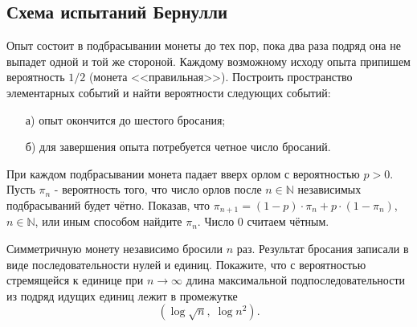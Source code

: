 
\subsection{Схема испытаний Бернулли}

\begin{problem}
Опыт состоит в подбрасывании монеты до тех пор, пока два раза подряд она не выпадет одной и той же стороной. Каждому 
возможному исходу опыта припишем вероятность $1/2$ (монета <<правильная>>). 
Построить пространство элементарных событий и найти вероятности следующих событий: 
\begin{enumerate}
\item[а)] опыт окончится до шестого бросания; 
\item[б)] для завершения опыта потребуется четное число бросаний. 
\end{enumerate}
\end{problem}


\begin{problem}
При каждом подбрасывании монета падает вверх орлом с вероятностью $p>0$. Пусть $\pi _{n} $ - вероятность того, что число орлов после $n\in {\mathbb N}$ независимых подбрасываний будет чётно. Показав, что $\pi _{n+1} =\left(1-p\right)\cdot \pi _{n} +p\cdot \left(1-\pi _{n} \right)$, $n\in {\mathbb N}$, или иным способом найдите $\pi _{n} $. Число $0$ считаем чётным.
\end{problem}

\begin{problem}
Симметричную монету независимо бросили $n$ раз. Результат бросания записали в виде последовательности нулей и единиц. Покажите, что с вероятностью стремящейся к единице при $n\to \infty $ длина максимальной подпоследовательности из подряд идущих единиц лежит в промежутке
\[\left(\log \sqrt{n} ,\; \log n^{2} \right).\] 
\end{problem}
